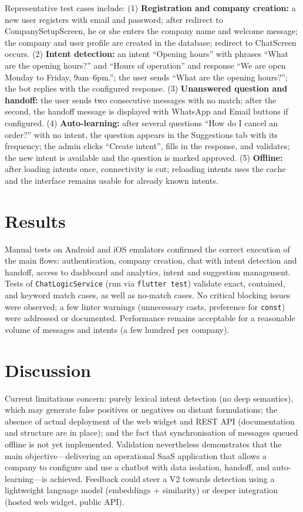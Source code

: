 \documentclass[12pt,a4paper]{report}
\begin{document}
Representative test cases include: (1) \textbf{Registration and company creation:} a new user registers with email and password; after redirect to CompanySetupScreen, he or she enters the company name and welcome message; the company and user profile are created in the database; redirect to ChatScreen occurs. (2) \textbf{Intent detection:} an intent ``Opening hours'' with phrases ``What are the opening hours?'' and ``Hours of operation'' and response ``We are open Monday to Friday, 9am--6pm.''; the user sends ``What are the opening hours?''; the bot replies with the configured response. (3) \textbf{Unanswered question and handoff:} the user sends two consecutive messages with no match; after the second, the handoff message is displayed with WhatsApp and Email buttons if configured. (4) \textbf{Auto-learning:} after several questions ``How do I cancel an order?'' with no intent, the question appears in the Suggestions tab with its frequency; the admin clicks ``Create intent'', fills in the response, and validates; the new intent is available and the question is marked approved. (5) \textbf{Offline:} after loading intents once, connectivity is cut; reloading intents uses the cache and the interface remains usable for already known intents.

\section{Results}

Manual tests on Android and iOS emulators confirmed the correct execution of the main flows: authentication, company creation, chat with intent detection and handoff, access to dashboard and analytics, intent and suggestion management. Tests of \texttt{ChatLogicService} (run via \texttt{flutter test}) validate exact, contained, and keyword match cases, as well as no-match cases. No critical blocking issues were observed; a few linter warnings (unnecessary casts, preference for \texttt{const}) were addressed or documented. Performance remains acceptable for a reasonable volume of messages and intents (a few hundred per company).

\section{Discussion}

Current limitations concern: purely lexical intent detection (no deep semantics), which may generate false positives or negatives on distant formulations; the absence of actual deployment of the web widget and REST API (documentation and structure are in place); and the fact that synchronisation of messages queued offline is not yet implemented. Validation nevertheless demonstrates that the main objective---delivering an operational SaaS application that allows a company to configure and use a chatbot with data isolation, handoff, and auto-learning---is achieved. Feedback could steer a V2 towards detection using a lightweight language model (embeddings + similarity) or deeper integration (hosted web widget, public API).
\end{document}
